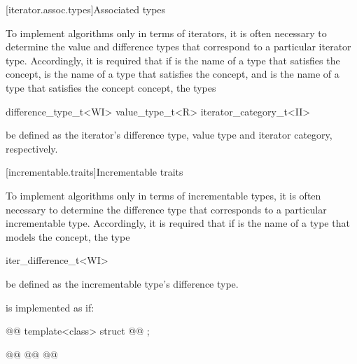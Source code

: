 \begin{addedblock}
[iterator.assoc.types]{Associated types}

{\color{oldclr}
\pnum
To implement algorithms only in terms of iterators, it is often necessary to
determine the value and
difference types that correspond to a particular iterator type.
Accordingly, it is required that if
 is the name of a type that
satisfies the 
concept,
 is the name of a type that
satisfies the  concept, and
 is the name of a type that satisfies the
 concept concept, the types

\begin{codeblock}
difference_type_t<WI>
value_type_t<R>
iterator_category_t<II>
\end{codeblock}

be defined as the iterator's difference type, value type
and iterator category, respectively.
} %

[incrementable.traits]{Incrementable traits}

{\color{newclr}
\pnum
To implement algorithms only in terms of incrementable types, it is often necessary to
determine the difference type that corresponds to a particular incrementable type.
Accordingly, it is required that if  is the name of a type that
models the  concept,
the type

\begin{codeblock}
iter_difference_t<WI>
\end{codeblock}

be defined as the incrementable type's difference type.
} %

\pnum
{} is implemented as if:

%
%
\begin{codeblock}
@@
  template<class> struct @@ { };

  @@
  @@
    @@


\end{codeblock}
\end{addedblock}
